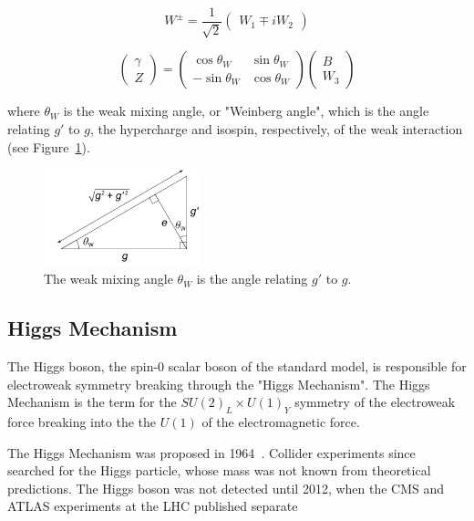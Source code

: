 \begin{equation}
	W^{\pm} = \frac{1}{\sqrt{2}}
	\begin{pmatrix}
		W_1 \mp iW_2
	\end{pmatrix}
	\label{eq:w}
\end{equation}


\begin{equation}
	\begin{pmatrix}
		\gamma \\
		Z 
	\end{pmatrix} = \begin{pmatrix}
		\cos{\theta_W} & \sin{\theta_W} \\
		-\sin{\theta_W} & \cos{\theta_W}
	\end{pmatrix}
	\begin{pmatrix}
		B \\
		W_3 
	\end{pmatrix}
	\label{eq:zgamma}
\end{equation}

where $\theta_W$ is the weak mixing angle, or "Weinberg angle", which is the angle relating $g'$ to $g$, the hypercharge and isospin, respectively, of the weak interaction (see Figure~\ref{fig:weinberg}).

\begin{figure}[htbp!]
	\centering
	\includegraphics[width=0.4\textwidth]{figures/Weinberg_angle.png}
	\caption{The weak mixing angle $\theta_W$ is the angle relating $g'$ to $g$.}
	\label{fig:weinberg}
\end{figure}


\subsection*{Higgs Mechanism}

The Higgs boson, the spin-0 scalar boson of the standard model, is responsible for electroweak symmetry breaking through the "Higgs Mechanism". The Higgs Mechanism is the term for the $SU(2)_L \times U(1)_Y$ symmetry of the electroweak force breaking into the the $U(1)$ of the electromagnetic force.


The Higgs Mechanism was proposed in 1964~\cite{higgs}. Collider experiments since searched for the Higgs particle, whose mass was not known from theoretical predictions. The Higgs boson was not detected until 2012, when the CMS and ATLAS experiments at the LHC published separate 


